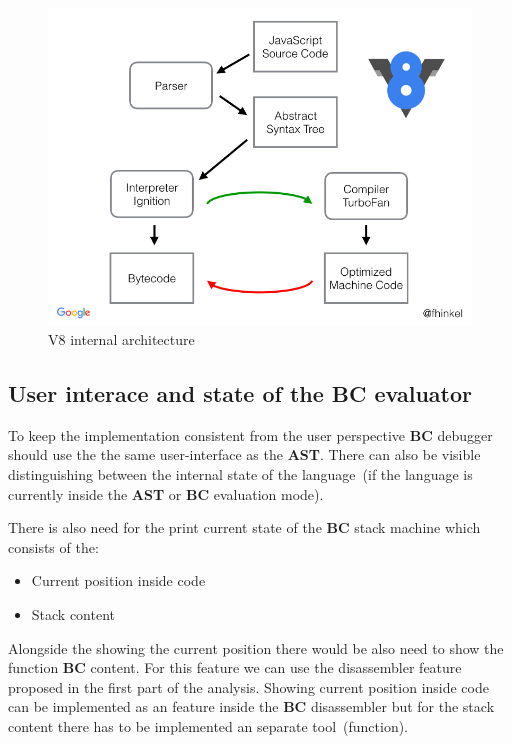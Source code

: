 \documentclass[thesis=M,english]{FITthesis}[2018/10/20]
\begin{document}
\begin{figure}\centering
	\includegraphics[width=\textwidth]{v8-architecture}
	\caption{V8 internal architecture}\label{fig:ast-v8-architecture}
\end{figure}

\subsection{User interace and state of the BC evaluator}\label{user-interface-and-state-of-the-bc-eval}

To keep the implementation consistent from the user perspective \textbf{BC} debugger should use the the same user-interface as the \textbf{AST}. There can also be visible distinguishing between the internal state of the language~(if the language is currently inside the \textbf{AST} or \textbf{BC} evaluation mode).

There is also need for the print current state of the \textbf{BC} stack machine which consists of the:

\begin{itemize}
	\item Current position inside code
	\item Stack content
\end{itemize}

Alongside the showing the current position there would be also need to show the function \textbf{BC} content. For this feature we can use the disassembler feature proposed in the first part of the analysis. Showing current position inside code can be implemented as an feature inside the \textbf{BC} disassembler but for the stack content there has to be implemented an separate tool~(function).
\end{document}
